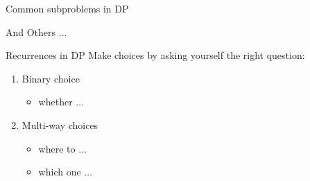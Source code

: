\begin{frame}{Common subproblems in DP}
  \centerline{\Huge And Others $\dots$}
\end{frame}
\begin{frame}{Recurrences in DP}
  Make choices by asking yourself the right question:
  \begin{enumerate}
	\item Binary choice
	  \begin{itemize}
		\item whether $\dots$
	  \end{itemize}
	\item Multi-way choices
	  \begin{itemize}
		\item where to $\dots$ 
		\item which one $\dots$
	  \end{itemize}
  \end{enumerate}
\end{frame}

